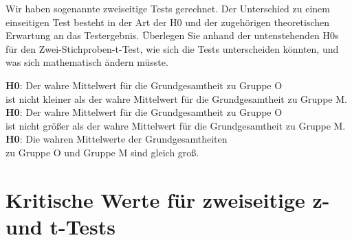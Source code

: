 Wir haben sogenannte zweiseitige Tests gerechnet.
Der Unterschied zu einem einseitigen Test besteht in der Art der H0 und der zugehörigen theoretischen Erwartung an das Testergebnis.
Überlegen Sie anhand der untenstehenden H0s für den Zwei-Stichproben-t-Test, wie sich die Tests unterscheiden könnten, und was sich mathematisch ändern müsste.

\begin{center}
  \textbf{H0}: Der wahre Mittelwert für die Grundgesamtheit zu Gruppe O\\
  ist nicht kleiner als der wahre Mittelwert für die Grundgesamtheit zu Gruppe M.\\
  \Zeile
  \textbf{H0}: Der wahre Mittelwert für die Grundgesamtheit zu Gruppe O\\
  ist nicht größer als der wahre Mittelwert für die Grundgesamtheit zu Gruppe M.\\
  \Zeile
  \textbf{H0}: Die wahren Mittelwerte der Grundgesamtheiten\\
  zu Gruppe O und Gruppe M sind gleich groß.
\end{center}

\newpage

\section*{Kritische Werte für zweiseitige z- und t-Tests}

